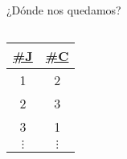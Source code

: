 \begin{frame}{¿D\'onde nos quedamos?}
\begin{columns}[T]
\begin{column}{0.48\linewidth}
\begin{center}
                \begin{tiny}
                    \begin{tabular}{|c|c|}
                        \hline
                        \underline{\#J} & \underline{\#C}\\
                        \hline
                        1 & 2  \\
                        \hline
                        2 & 3\\
                        \hline
                        3 & 1\\
                        \hline
                        $\vdots$ & $\vdots$\\
                        \hline
                    \end{tabular}
                \end{tiny}
                
            \end{center}
        \end{column}
        
    \end{columns}

\end{frame}



